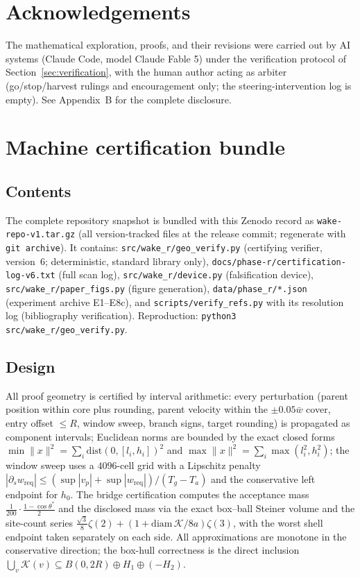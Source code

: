\documentclass[11pt]{article}
\newcommand{\Ta}{T_a}
\newcommand{\Tg}{T_g}
\newcommand{\wbar}{\bar w}
\begin{document}
\section*{Acknowledgements}
The mathematical exploration, proofs, and their revisions were carried out
by AI systems (Claude Code, model Claude Fable 5) under the verification
protocol of Section~\ref{sec:verification}, with the human author acting as
arbiter (go/stop/harvest rulings and encouragement only; the
steering-intervention log is empty). See Appendix~B for the complete
disclosure.

\appendix

\section{Machine certification bundle}\label{app:cert}

\subsection{Contents}
The complete repository snapshot is bundled with this Zenodo record as
\texttt{wake-repo-v1.tar.gz} (all version-tracked files at the release
commit; regenerate with \texttt{git archive}). It contains:
\texttt{src/wake\_r/geo\_verify.py} (certifying verifier, version~6;
deterministic, standard library only),
\texttt{docs/phase-r/certification-log-v6.txt} (full scan log),
\texttt{src/wake\_r/device.py} (falsification device),
\texttt{src/wake\_r/paper\_figs.py} (figure generation),
\texttt{data/phase\_r/*.json} (experiment archive E1--E8c), and
\texttt{scripts/verify\_refs.py} with its resolution log (bibliography
verification). Reproduction: \texttt{python3 src/wake\_r/geo\_verify.py}.

\subsection{Design}
All proof geometry is certified by interval arithmetic: every perturbation
(parent position within core plus rounding, parent velocity within the
$\pm0.05\wbar$ cover, entry offset $\le R$, window sweep, branch signs,
target rounding) is propagated as component intervals; Euclidean norms are
bounded by the exact closed forms
$\min\|x\|^2=\sum_i\mathrm{dist}(0,[l_i,h_i])^2$ and
$\max\|x\|^2=\sum_i\max(l_i^2,h_i^2)$; the window sweep uses a $4096$-cell
grid with a Lipschitz penalty
$|\partial_s w_{\mathrm{req}}|\le(\sup|v_p|+\sup|w_{\mathrm{req}}|)/(\Tg-\Ta)$
and the conservative left endpoint for $h_0$. The bridge certification
computes the acceptance mass $\frac{1}{200}\cdot\frac{1-\cos\theta^*}{2}$
and the disclosed mass via the exact box--ball Steiner volume and the
site-count series $\frac{\sqrt3}{8}\zeta(2)+(1+\mathrm{diam}\,
\mathcal{K}/8a)\zeta(3)$, with the worst shell endpoint taken separately on
each side. All approximations are monotone in the conservative direction;
the box-hull correctness is the direct inclusion
$\bigcup_v\mathcal{K}(v)\subseteq B(0,2R)\oplus H_1\oplus(-H_2)$.
\end{document}
